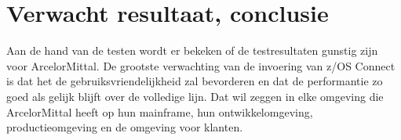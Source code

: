 \section{Verwacht resultaat, conclusie}%
\label{sec:verwachte_resultaten}

Aan de hand van de testen wordt er bekeken of de testresultaten gunstig zijn voor ArcelorMittal. De grootste verwachting van de invoering van z/OS Connect is dat het de gebruiksvriendelijkheid zal bevorderen en dat de performantie zo goed als gelijk blijft over de volledige lijn. Dat wil zeggen in elke omgeving die ArcelorMittal heeft op hun mainframe, hun ontwikkelomgeving, productieomgeving en de omgeving voor klanten.
